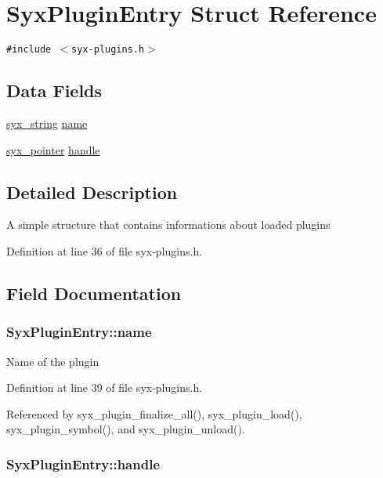 \hypertarget{struct_syx_plugin_entry}{
\section{SyxPluginEntry Struct Reference}
\label{struct_syx_plugin_entry}
}
{\tt \#include $<$syx-plugins.h$>$}

\subsection*{Data Fields}
\begin{CompactItemize}
\item 
\hyperlink{syx-types_8h_1bff1fd86072dd98849437bc9dcb35c3}{syx\_\-string} \hyperlink{struct_syx_plugin_entry_e887a2302efdde8c21146142ccc47768}{name}
\item 
\hyperlink{syx-types_8h_51c518ab1f082eb4330ca143afb1584f}{syx\_\-pointer} \hyperlink{struct_syx_plugin_entry_75374f53519ed4109f6227c512241219}{handle}
\end{CompactItemize}


\subsection{Detailed Description}
A simple structure that contains informations about loaded plugins 

Definition at line 36 of file syx-plugins.h.

\subsection{Field Documentation}
\hypertarget{struct_syx_plugin_entry_e887a2302efdde8c21146142ccc47768}{
\subsubsection{ {\bf SyxPluginEntry::name}}}
\label{struct_syx_plugin_entry_e887a2302efdde8c21146142ccc47768}


Name of the plugin 

Definition at line 39 of file syx-plugins.h.

Referenced by syx\_\-plugin\_\-finalize\_\-all(), syx\_\-plugin\_\-load(), syx\_\-plugin\_\-symbol(), and syx\_\-plugin\_\-unload().\hypertarget{struct_syx_plugin_entry_75374f53519ed4109f6227c512241219}{
\subsubsection{ {\bf SyxPluginEntry::handle}}}
\label{struct_syx_plugin_entry_75374f53519ed4109f6227c512241219}


